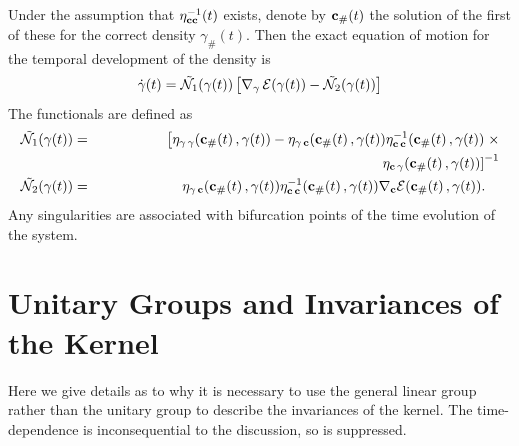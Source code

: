 Under the assumption that $\eta _{{\bf cc}}^{-1}(t)$ exists, denote by ${\bf %
c}_{\#}(t)$ the solution of the first of these for the correct density $%
\gamma _{\#}(t)$. Then the exact equation of motion for the temporal
development of the density is 
\begin{equation}
\dot{\gamma}(t)=\tilde{{\cal N}_{1}}(\gamma (t))\left[ \nabla _{\gamma }\,%
{\cal E}(\gamma (t))-\tilde{{\cal N}_{2}}(\gamma (t))\right]
\label{Appgammadot}
\end{equation}%
The functionals are defined as %
\begin{eqnarray}
\tilde{{\cal N}_{1}}(\gamma (t))& =&\left[ \eta _{\gamma \,\gamma }({\bf c}%
_{\#}(t)\,,\gamma (t))-\eta _{\gamma \,{\bf c}}({\bf c}_{\#}(t)\,,\gamma
(t))\eta _{{\bf c}\,{\bf c}}^{-1}({\bf c}_{\#}(t)\,,\gamma (t))\right. \times
\nonumber \\
&& \qquad \qquad \qquad \qquad \qquad \qquad \qquad \qquad \qquad \qquad
\left. \eta _{{\bf c}\,\gamma }({\bf c}_{\#}(t)\,,\gamma (t))\right] ^{-1} 
\nonumber \\
\tilde{{\cal N}_{2}}(\gamma (t))& =&\eta _{\gamma \,{\bf c}}({\bf c}%
_{\#}(t)\,,\gamma (t))\eta _{{\bf c}\,{\bf c}}^{-1}({\bf c}_{\#}(t)\,,\gamma
(t))\nabla _{{\bf c}}{\cal E}({\bf c}_{\#}(t)\,,\gamma (t)).\quad 
\end{eqnarray}
Any singularities are associated with bifurcation points of the time
evolution of the system.

\section{Unitary Groups and Invariances of the Kernel}

\noindent Here we give details as to why it is necessary to use the general
linear group rather than the unitary group to describe the invariances of
the kernel. The time-dependence is inconsequential to the discussion, so is
suppressed.

